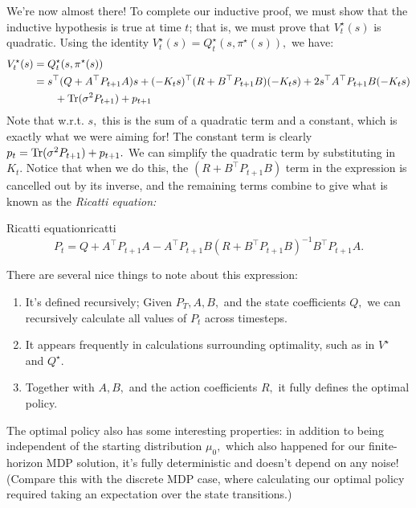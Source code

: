 \documentclass[../main/main]{subfiles}
\begin{document}
We're now almost there! To complete our inductive proof, we must show that the
inductive hypothesis is true at time $t$; that is, we must prove that
$V^\star_t(s)$ is quadratic.
Using the identity $V^\star_t(s) = Q^\star_t(s, \pi^\star(s)),$ we have: \begin{align*}
    V^\star_t(s) &= Q^\star_t(s, \pi^\star(s)) \\
    &= s^\top (Q + A^\top P_{t+1} A) s + (-K_t s)^\top (R + B^\top P_{t+1} B) (-K_t s)
    + 2s^\top A^\top P_{t+1} B (-K_t s) \\
        &\qquad + \operatorname*{\textrm{Tr}}(\sigma^2 P_{t+1}) + p_{t+1}
\end{align*}
Note that w.r.t. $s,$ this is the sum of a quadratic term and a constant,
which is exactly what we were aiming for!
The constant term is clearly $p_t = \operatorname*{\textrm{Tr}}(\sigma^2 P_{t+1}) + p_{t+1}.$
We can simplify the quadratic term by substituting in $K_t.$
Notice that when we do this, the $(R+B^\top P_{t+1} B)$ term in
the expression is cancelled out by its inverse, and the remaining terms combine to give
what is known as the \emph{Ricatti equation:}
\begin{theorem}{Ricatti equation}{ricatti}
    \[
        P_t = Q + A^\top P_{t+1} A - A^\top P_{t+1} B (R + B^\top P_{t+1} B)^{-1} B^\top P_{t+1} A.
    \]
\end{theorem}
There are several nice things to note about this expression:
\begin{enumerate}
    \item It's defined recursively; Given $P_T, A, B,$ and the state coefficients $Q,$ we can
    recursively calculate all values of $P_t$ across timesteps.
    \item It appears frequently in calculations surrounding optimality,
    such as in $V^\star$ and $Q^\star$.
    \item Together with $A, B,$ and the action coefficients $R,$ it fully defines the optimal policy.
\end{enumerate}
The optimal policy also has some interesting properties: in addition to being
independent of the starting distribution $\mu_0,$ which also happened for our
finite-horizon MDP solution, it's fully deterministic and doesn't depend on any noise!
(Compare this with the discrete MDP case, where calculating our optimal policy
required taking an expectation over the state transitions.)
\end{document}
